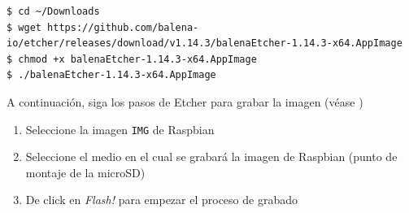 \documentclass[letterpaper,10.5pt]{article}
\begin{document}
\begin{Verbatim}[fontsize=\footnotesize]
$ cd ~/Downloads
$ wget https://github.com/balena-io/etcher/releases/download/v1.14.3/balenaEtcher-1.14.3-x64.AppImage
$ chmod +x balenaEtcher-1.14.3-x64.AppImage
$ ./balenaEtcher-1.14.3-x64.AppImage
\end{Verbatim}


A continuación, siga los pasos de Etcher para grabar la imagen (véase )
\begin{enumerate}[noitemsep]
	\item Seleccione la imagen \texttt{IMG} de Raspbian
	\item Seleccione el medio en el cual se grabará la imagen de Raspbian (punto de montaje de la microSD)
	\item De click en \emph{Flash!} para empezar el proceso de grabado
\end{enumerate}
\end{document}
